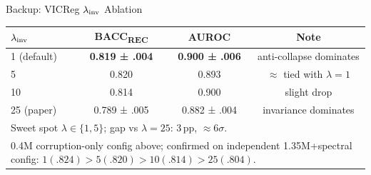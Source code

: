 \documentclass[aspectratio=169,10pt]{beamer}
\begin{document}
\begin{frame}{Backup: VICReg $\lambda_{\rm inv}$ Ablation}
\small
\begin{tabular}{lccc}
\toprule
$\lambda_{\rm inv}$ & BACC\textsubscript{REC} & AUROC & Note \\
\midrule
1 (default) & \textbf{0.819 ± .004} & \textbf{0.900 ± .006} & anti-collapse dominates \\
5           & 0.820 & 0.893 & $\approx$ tied with $\lambda{=}1$ \\
10          & 0.814 & 0.900 & slight drop \\
25 (paper)  & 0.789 ± .005 & 0.882 ± .004 & invariance dominates \\
\midrule
\multicolumn{4}{l}{\footnotesize Sweet spot $\lambda \in \{1,5\}$; gap vs $\lambda=25$: 3\,pp, $\approx6\sigma$.}\\
\multicolumn{4}{l}{\footnotesize 0.4M corruption-only config above; confirmed on independent 1.35M+spectral config: $1(.824){>}5(.820){>}10(.814){>}25(.804)$.}
\end{tabular}
\end{frame}
\end{document}
